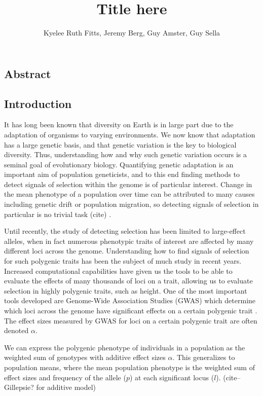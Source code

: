 \documentclass[a4paper,11pt]{article}
\newcommand{\jb}[1]{{\color{blue} (#1)} }
\begin{document}
\title{\vspace{-2cm}
  Title here
}
\author{Kyelee Ruth Fitts, Jeremy Berg, Guy Amster, Guy Sella}
\maketitle


\subsection*{Abstract}

\subsection*{Introduction}

It has long been known that diversity on Earth is in large part due to the
adaptation of organisms to varying environments. We now know that
adaptation has a large genetic basis, and that genetic variation is
the key to biological diversity. Thus, understanding how and why such
genetic variation occurs is a seminal goal of evolutionary
biology. Quantifying genetic adaptation is an important aim of population
geneticists, and to this end finding methods to detect signals of
selection within the genome is of particular interest. Change in the
mean phenotype of a population over time can be attributed to many causes including genetic
drift or population migration, so detecting signals of selection in
particular is no trivial task \jb{cite}. 

Until recently, the study of detecting selection has been limited to
large-effect alleles, when in fact numerous phenotypic traits of interest
are affected by many different loci across the genome. Understanding
how to find signals of selection for such polygenic traits has been
the subject of much study in recent years. Increased computational
capabilities have given us the tools to be able to evaluate the effects
of many thousands of loci on a trait, allowing us to evaluate
selection in highly polygenic traits, such as height. One of the most
important tools developed are Genome-Wide Association Studies (GWAS)
which determine which loci across the genome have significant effects
on a certain polygenic trait \cite{gwasoverview}. The effect sizes
measured by GWAS for loci on a certain polygenic trait are often
denoted $\alpha$.

We can express the polygenic phenotype of individuals in a population
as the weighted sum of genotypes with additive effect sizes
$\alpha$. This generalizes to population means, where the mean
population phenotype is the weighted sum of effect sizes and frequency
of the allele ($p$) at each significant locus ($l$). \jb{cite--
  Gillepsie? for additive model} 
\end{document}
